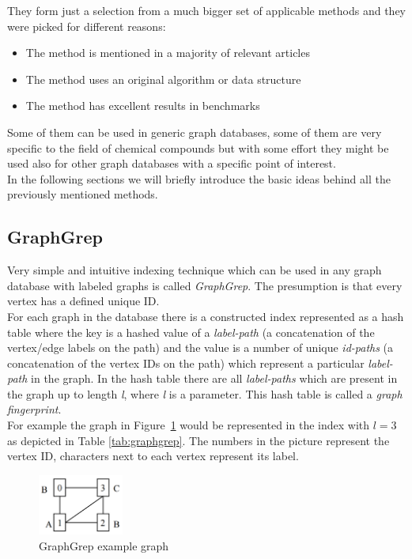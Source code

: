 They form just a selection from a much bigger set of applicable methods and they were picked for different reasons:

\begin{itemize}
	\item The method is mentioned in a majority of relevant articles
	\item The method uses an original algorithm or data structure
	\item The method has excellent results in benchmarks
\end{itemize}

Some of them can be used in generic graph databases, some of them are very specific to the field of chemical compounds but with some effort they might be used also for other graph databases with a specific point of interest.\\

In the following sections we will briefly introduce the basic ideas behind all the previously mentioned methods.

\subsection{GraphGrep}

Very simple and intuitive indexing technique which can be used in any graph database with labeled graphs is called \textit{GraphGrep}. The presumption is that every vertex has a defined unique ID.\\

For each graph in the database there is a constructed index represented as a hash table where the key is a hashed value of a \textit{label-path} (a concatenation of the vertex/edge labels on the path) and the value is a number of unique \textit{id-paths} (a concatenation of the vertex IDs on the path) which represent a particular \textit{label-path} in the graph. In the hash table there are all \textit{label-paths} which are present in the graph up to length \textit{l}, where \textit{l} is a parameter. This hash table is called a \textit{graph fingerprint}.\\

For example the graph in Figure~\ref{fig:graphgrep} would be represented in the index with $l=3$ as depicted in Table \ref{tab:graphgrep}. The numbers in the picture represent the vertex ID, characters next to each vertex represent its label.

\begin{figure}[h]
	\centering
	\includegraphics[width=0.25\textwidth]{../img/graphgrep.png}
	\caption{GraphGrep example graph}
	\label{fig:graphgrep}
\end{figure}

